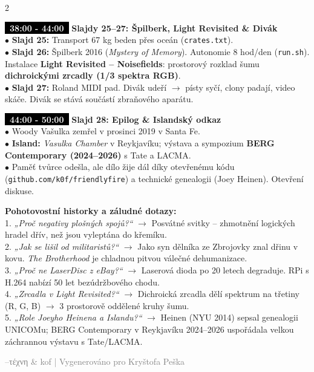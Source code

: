 \documentclass[a4paper,9.5pt]{article}
\newcommand{\badge}[1]{\textbf{\colorbox{black}{\textcolor{white}{\footnotesize~#1~}}}}
\begin{document}
\begin{multicols}{2}
\begin{tcolorbox}
\badge{38:00 - 44:00} \textbf{Slajdy 25--27: Špilberk, Light Revisited \& Divák}\\
$\bullet$ \textbf{Slajd 25:} Transport 67 kg beden přes oceán (\texttt{crates.txt}).\\
$\bullet$ \textbf{Slajd 26:} Špilberk 2016 (\textit{Mystery of Memory}). Autonomie 8 hod/den (\texttt{run.sh}). Instalace \textbf{Light Revisited – Noisefields}: prostorový rozklad šumu \textbf{dichroickými zrcadly (1/3 spektra RGB)}.\\
$\bullet$ \textbf{Slajd 27:} Roland MIDI pad. Divák udeří $\rightarrow$ písty syčí, clony padají, video skáče. Divák se stává součástí zbraňového aparátu.
\end{tcolorbox}

\begin{tcolorbox}
\badge{44:00 - 50:00} \textbf{Slajd 28: Epilog \& Islandský odkaz}\\
$\bullet$ Woody Vašulka zemřel v prosinci 2019 v Santa Fe.\\
$\bullet$ \textbf{Island:} \textit{Vasulka Chamber} v Reykjavíku; výstava a sympozium \textbf{BERG Contemporary (2024--2026)} s Tate a LACMA.\\
$\bullet$ Paměť tvůrce odešla, ale dílo žije dál díky otevřenému kódu (\texttt{github.com/k0f/friendlyfire}) a technické genealogii (Joey Heinen). Otevření diskuse.
\end{tcolorbox}

\begin{tcolorbox}[colback=black!8]
\textbf{Pohotovostní historky a záludné dotazy:}\\
1. \textit{„Proč negativy plošných spojů?“} $\rightarrow$ Posvátné svitky – zhmotnění logických hradel dřív, než jsou vyleptána do křemíku.\\
2. \textit{„Jak se lišil od militaristů?“} $\rightarrow$ Jako syn dělníka ze Zbrojovky znal dřinu v kovu. \textit{The Brotherhood} je chladnou pitvou válečné dehumanizace.\\
3. \textit{„Proč ne LaserDisc z eBay?“} $\rightarrow$ Laserová dioda po 20 letech degraduje. RPi s H.264 nabízí 50 let bezúdržbového chodu.\\
4. \textit{„Zrcadla v Light Revisited?“} $\rightarrow$ Dichroická zrcadla dělí spektrum na třetiny (R, G, B) $\rightarrow$ 3 prostorově oddělené kruhy šumu.\\
5. \textit{„Role Joeyho Heinena a Islandu?“} $\rightarrow$ Heinen (NYU 2014) sepsal genealogii UNICOMu; BERG Contemporary v Reykjavíku 2024--2026 uspořádala velkou záchrannou výstavu s Tate/LACMA.
\end{tcolorbox}

\end{multicols}

\vspace{0.1cm}
\centering\footnotesize\textcolor{gray}{--τέχνη \& kof | Vygenerováno pro Kryštofa Peška}
\end{document}

